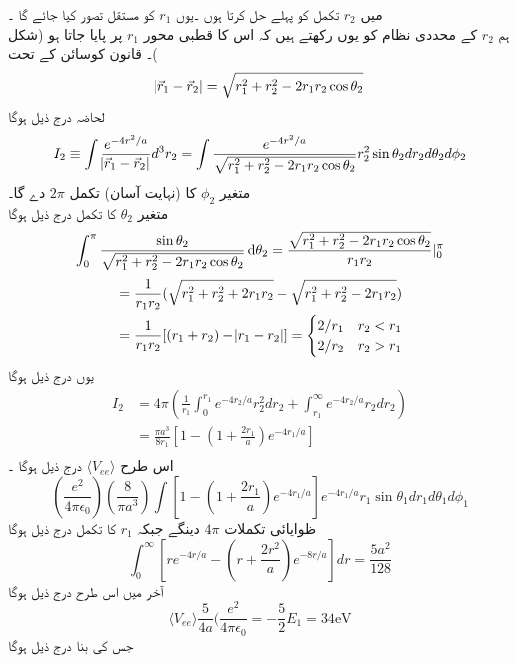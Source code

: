 میں 
\(r_{2}\)
 تکمل کو پہلے حل کرتا ہوں ۔یوں
  \(r_{1}\)
کو مستقل تصور کیا جائے گا ۔\\
ہم 
\(r_{2}\)
کے  محددی نظام کو یوں رکھتے ہیں کہ اس کا  قطبی محور
 \(r_{1}\)
پر پایا جاتا ہو (شکل )۔
قانون  کوسائن کے تحت 
\[\abs{\vec{r}_{1}-\vec{r}_{2}}=\sqrt{r_{1}^{2}+r_{2}^{2}-2r_{1}r_{2}\cos{\theta_{2}}}\]
لحاضہ درج ذیل ہوگا \\
\[I_{2}\equiv\int\frac{e^{-4r^{2}/a}}{\abs{\vec{r}_{1}-\vec{r}_{2}}}d^{3}r_{2}=\int\frac{e^{-4r^{2}/a}}{\sqrt{r_{1}^{2}+r_{2}^{2}-2r_{1}r_{2}\cos{\theta_{2}}}}r_{2}^{2}\sin{\theta_{2}}dr_{2}d\theta_{2}d\phi_{2}\]
متغیر 
\(\phi_{2}\)
کا (نہایت آسان) تکمل  
\(2\pi\)
 دے گا۔\\
متغیر 
\(\theta_{2}\)
 کا تکمل  درج ذیل ہوگا
\begin{align*}
\int_{0}^{\pi}\frac{\sin{\theta_{2}}}{\sqrt{r_{1}^{2}+r_{2}^{2}-2r_{1}r_{2}\cos{\theta_{2}}}}\dif{\theta_{2}}=\frac{\sqrt{r_{1}^{2}+r_{2}^{2}-2r_{1}r_{2}\cos{\theta_{2}}}}{r_{1}r_{2}}|_{0}^{\pi}
\end{align*}
\begin{align*}
&=\frac{1}{r_{1}r_{2}}(\sqrt{r_{1}^{2}+r_{2}^{2}+2r_{1}r_{2}}-\sqrt{r_{1}^{2}+r_{2}^{2}-2r_{1}r_{2}})\\
&=\frac{1}{r_{1}r_{2}}[(r_{1}+r_{2})-\abs{r_{1}-r_{2}}]=\begin{cases}
2/r_{1} & r_{2}<r_{1}\\
2/r_{2}&r_{2}>r_{1}\\
\end{cases}\\
\end{align*}
یوں درج ذیل ہوگا 
\begin{align*}
I_{2}&=4\pi(\frac{1}{r_{1}}\int_{0}^{r_{1}}e^{-4r_{2}/a}r_{2}^{2}dr_{2}+\int_{r_{1}}^{\infty}e^{-4r_{2}/a}r_{2}dr_{2})\\
&=\frac{\pi a^{3}}{8r_{1}}[1-(1+\frac{2r_{1}}{a})e^{-4r_{1}/a}]\\
\end{align*}
اس طرح 
\(\langle V_{ee} \rangle \)
درج ذیل ہوگا ۔
\[(\frac{e^{2}}{4\pi\epsilon_{0}})(\frac{8}{\pi a^{3}})\int[1-(1+\frac{2r_{1}}{a})e^{-4r_{1}/a}]e^{-4r_{1}/a}r_{1}\sin{\theta_{1}}dr_{1}d\theta_{1}d\phi_{1}\]
ظوایائی تکملات 
\(4\pi\)
دینگے جبکہ 
\(r_{1}\)
 کا تکمل درج ذیل ہوگا
\[\int_{0}^{\infty}[re^{-4r/a}-(r+\frac{2r^{2}}{a})e^{-8r/a}]dr=\frac{5a^{2}}{128}\]
آخر میں اس طرح درج ذیل ہوگا 
\[\langle V_{ee} \rangle\frac{5}{4a}(\frac{e^{2}}{4\pi\epsilon_{0}}=-\frac{5}{2}E_{1}=34\text{eV}\]
جس کی بنا درج ذیل ہوگا 
